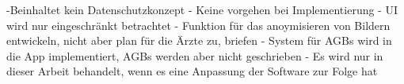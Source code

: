 -Beinhaltet kein Datenschutzkonzept 
- Keine vorgehen bei Implementierung 
- UI wird nur eingeschränkt betrachtet 
- Funktion für das anoymisieren von Bildern entwickeln, nicht aber plan für die Ärzte zu, briefen 
- System für AGBs wird in die App implementiert, AGBs werden aber nicht geschrieben 
- Es wird nur in dieser Arbeit behandelt, wenn es eine Anpassung der Software zur Folge hat